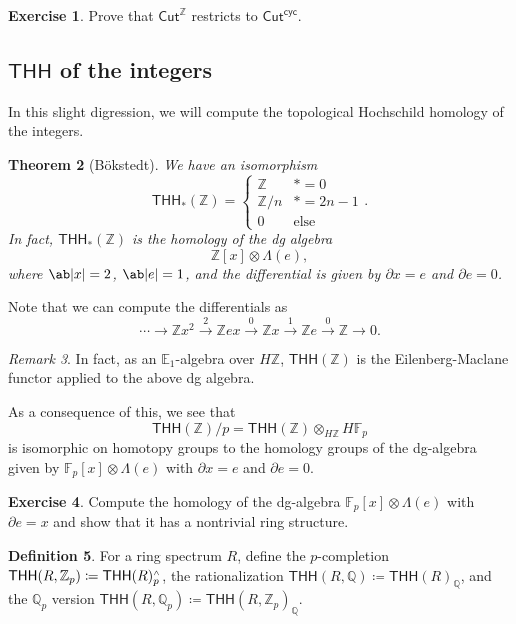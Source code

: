 \documentclass[10pt, oneside]{memoir}
\newtheorem{thm}{Theorem}[subsection]
\theoremstyle{definition}
\newtheorem{defn}[thm]{Definition}
\newtheorem{exer}[thm]{Exercise}
\theoremstyle{remark}
\newtheorem{rmk}[thm]{Remark}
\theoremstyle{plain}
\theoremstyle{definition}
\theoremstyle{remark}
\newcommand{\Z}{\mathbb{Z}}
\newcommand{\Q}{\mathbb{Q}}
\newcommand{\E}{\mathbb{E}}
\newcommand{\F}{\mathbb{F}}
\newcommand{\ms}[1]{\mathsf{#1}}
\newcommand{\1}{\mathbf{1}}
\newcommand{\2}{\mathbf{2}}
\newcommand{\3}{\mathbf{3}}
\newcommand{\THH}{\ms{THH}}
\newcommand{\sw}{\mathsmaller{\wedge}}
\begin{document}
\begin{exer}
    Prove that $\ms{Cut}^{\Z}$ restricts to $\ms{Cut}^{\ms{cyc}}$.
\end{exer}


\subsection{$\THH$ of the integers}%
\label{sub:THH of the integers}

In this slight digression, we will compute the topological Hochschild homology of the integers.

\begin{thm}[B\"okstedt]\label{thm:thhofz}
    We have an isomorphism
    \[ \THH_*(\Z) = \begin{cases}
        \Z & * = 0 \\
        \Z/n & * = 2n-1 \\
        0 & \text{else}
    \end{cases}. \]
    In fact, $\THH_*(\Z)$ is the homology of the dg algebra
    \[ \Z[x] \otimes \Lambda(e), \]
    where $\ab|x| = 2$, $\ab|e| = 1$, and the differential is given by $\partial x = e$ and $\partial e = 0$.
\end{thm}

Note that we can compute the differentials as
\[ \cdots \to \Z x^2 \xrightarrow{2} \Z ex \xrightarrow{0} \Z x \xrightarrow{1} \Z e \xrightarrow{0} \Z \to 0. \]

\begin{rmk}
    In fact, as an $\E_1$-algebra over $H \Z$, $\THH(\Z)$ is the Eilenberg-Maclane functor applied to the above dg algebra.
\end{rmk}

As a consequence of this, we see that
\[ \THH(\Z) /p = \THH(\Z) \otimes_{H \Z} H \F_p \]
is isomorphic on homotopy groups to the homology groups of the dg-algebra given by $\F_p[x] \otimes \Lambda(e)$ with $\partial x = e$ and $\partial e = 0$.

\begin{exer}
    Compute the homology of the dg-algebra $\F_p[x] \otimes \Lambda(e)$ with $\partial e = x$ and show that it has a nontrivial ring structure.
\end{exer}

\begin{defn}
    For a ring spectrum $R$, define the $p$-completion $\THH(R, \Z_p) \coloneqq \THH(R)_p^{\sw}$, the rationalization $\THH(R, \Q) \coloneqq \THH(R)_{\Q}$, and the $\Q_p$ version $\THH(R, \Q_p) \coloneqq \THH(R, \Z_p)_{\Q}$.
\end{defn}
\end{document}
